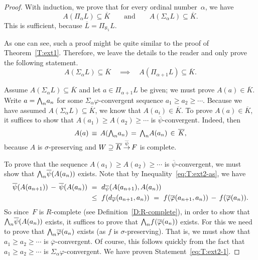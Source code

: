 \documentclass[main.tex]{subfiles}
\begin{document}
\begin{proof}
With induction,
we prove that for every ordinal number~$\alpha$,
we have 
\begin{equation*}
A(\Pi_\alpha L)\subseteq \overline K
\qquad\text{and}\qquad
A(\Sigma_\alpha L)\subseteq \overline K.
\end{equation*}
This is sufficient, because $\overline L = \Pi_{\aleph_1} L$.

As one can  see,
such a proof might be quite similar to the proof of Theorem~\ref{T:ext1}.
Therefore,
we leave the details to the reader
and only prove the following statement.
\begin{equation}
\label{eq:T:ext2-1}
A(\Sigma_\alpha L) \subseteq \overline K
\quad\implies\quad
A(\Pi_{\alpha+1}L)\subseteq\overline K.
\end{equation}

Assume $A(\Sigma_\alpha L)\subseteq \overline{K}$
and let $a\in \Pi_{\alpha+1} L$ be given;
we must prove $A(a)\in \overline K$.
Write $a=\textstyle{\bigwedge}_n a_n$ for some $\Sigma_{\alpha}\varphi$-convergent
sequence
$a_1 \geq a_2 \geq \dotsb$.
Because we have assumed $A(\Sigma_\alpha L)\subseteq \overline{K}$,
we know that $A(a_i) \in \overline K$.
To prove $A(a)\in\overline K$,
it suffices to show that $A(a_1) \geq A(a_2) \geq \dotsb$
is $\overline{\psi}$-convergent.
Indeed, then
\begin{equation*}
A(a) \,\equiv\, A(\textstyle{\bigwedge}_n a_n) \,=\, \textstyle{\bigwedge}_n A(a_n)\,\in\, \overline{K},
\end{equation*}
because $A$ is $\sigma$-preserving and 
$W \supseteq \overline{K}\,\smash{\stackrel{\overline{\psi}}{\rightarrow}}\,F$
is complete.

To prove that the sequence $A(a_1)\geq A(a_2) \geq \dotsb$
is $\overline{\psi}$-convergent,
we must show that $\textstyle{\bigwedge}_n \overline \psi(A(a_n))$ exists.
Note that by Inequality~\eqref{eq:T:ext2-as},
we have
\begin{alignat*}{3}
\overline{\psi}(A(a_{n+1}))
\,-\, \overline{\psi}(A(a_n))
\ &=\ 
\ld{\overline\psi}(A(a_{n+1}),A(a_n))\\
\ &\leq\ 
f(\ld{\overline\varphi}(a_{n+1},a_n))
\ =\ 
f(\overline\varphi(a_{n+1},a_n)) 
\,-\, f(\overline\varphi(a_n)).
\end{alignat*}
So since~$F$ is $R$-complete (see Definition~\ref{D:R-complete}),
in order to show that $\textstyle{\bigwedge}_n\overline{\psi}(A(a_n))$
exists,
it suffices to prove that $\textstyle{\bigwedge}_n f(\overline{\varphi}(a_n))$
exists. 
For this
we need to prove that $\textstyle{\bigwedge}_n\overline\varphi(a_n)$ exists
(as  $f$ is $\sigma$-preserving).
That is,
we must show that $a_1 \geq a_2 \geq \dotsb$ is 
$\overline{\varphi}$-convergent.
Of course,
this follows quickly from the fact that $a_1 \geq a_2 \geq \dotsb$
is $\Sigma_{\alpha}\varphi$-convergent.
We have proven Statement~\eqref{eq:T:ext2-1}.
\end{proof}
\end{document}
